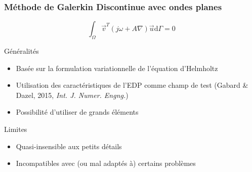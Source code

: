 \documentclass[10pt, compress]{beamer}
\begin{document}
\begin{frame}
	\frametitle{Méthode de Galerkin Discontinue avec ondes planes}

	$$\int_\Omega \vec{v}^T\left(j\omega + A\nabla\right)\vec{u}\mathrm{d}\Gamma = 0$$

	\begin{block}{Généralités}
		\begin{itemize}
			\item Basée sur la formulation variationnelle de l'équation d'Helmholtz
            \item Utilisation des caractéristiques de l'EDP comme champ de test (Gabard \& Dazel, 2015, \textit{Int. J.
                Numer. Engng.})
			\item Possibilité d'utiliser de grands éléments
		\end{itemize}
	\end{block}

	\pause

	\begin{block}{Limites}
		\begin{itemize}
			\item Quasi-insensible aux petits détails
			\item Incompatibles avec (ou mal adaptés à) certains problèmes
		\end{itemize}
	\end{block}
\end{frame}
\end{document}
